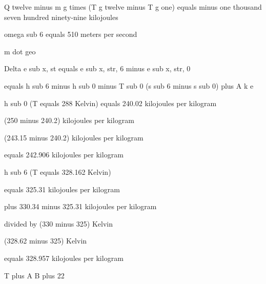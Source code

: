 Q twelve minus m g times (T g twelve minus T g one) equals minus one thousand seven hundred ninety-nine kilojoules

omega sub 6 equals 510 meters per second

m dot geo

Delta e sub x, st equals e sub x, str, 6 minus e sub x, str, 0

equals h sub 6 minus h sub 0 minus T sub 0 (s sub 6 minus s sub 0) plus A k e

h sub 0 (T equals 288 Kelvin) equals 240.02 kilojoules per kilogram

(250 minus 240.2) kilojoules per kilogram

(243.15 minus 240.2) kilojoules per kilogram

equals 242.906 kilojoules per kilogram

h sub 6 (T equals 328.162 Kelvin)

equals 325.31 kilojoules per kilogram

plus 330.34 minus 325.31 kilojoules per kilogram

divided by (330 minus 325) Kelvin

(328.62 minus 325) Kelvin

equals 328.957 kilojoules per kilogram

T plus A B plus 22